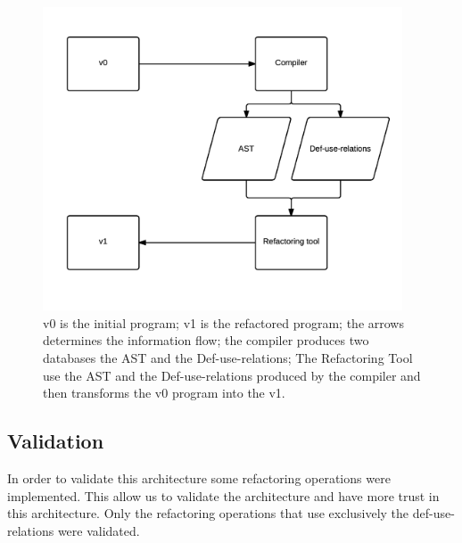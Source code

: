 \begin{figure}[htbp]
	\centering
	\includegraphics[width=0.95\textwidth]{img/arquitectura.png}
	\caption{v0 is the initial program; v1 is the refactored program; the arrows determines the information flow; the compiler produces two databases the AST and the Def-use-relations; The Refactoring Tool use the AST and the Def-use-relations produced by the compiler and then transforms the v0 program into the v1.}
	\label{fig:architecture}
\end{figure}


\subsection{Validation}
In order to validate this architecture some refactoring operations were implemented. 
This allow us to validate the architecture and have more trust in this architecture.
Only the refactoring operations that use exclusively the def-use-relations were validated.

